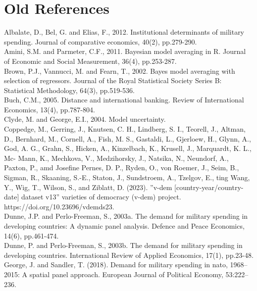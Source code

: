 \documentclass[12pt,a4paper]{article}
\begin{document}
\clearpage

\section{Old References}
Albalate, D., Bel, G. and Elias, F., 2012. Institutional determinants of military spending. Journal of comparative economics, 40(2), pp.279-290. \\

Amini, S.M. and Parmeter, C.F., 2011. Bayesian model averaging in R. Journal of Economic and Social Measurement, 36(4), pp.253-287. \\

Brown, P.J., Vannucci, M. and Fearn, T., 2002. Bayes model averaging with selection of regressors. Journal of the Royal Statistical Society Series B: Statistical Methodology, 64(3), pp.519-536.\\

Buch, C.M., 2005. Distance and international banking. Review of International Economics, 13(4), pp.787-804. \\

Clyde, M. and George, E.I., 2004. Model uncertainty.\\

Coppedge, M., Gerring, J., Knutsen, C. H., Lindberg, S. I., Teorell, J., Altman, D., Bernhard, M., Cornell, A., Fish, M. S., Gastaldi, L., Gjerloew, H., Glynn, A., God, A. G., Grahn, S., Hicken, A., Kinzelbach, K., Krusell, J., Marquardt, K. L., Mc- Mann, K., Mechkova, V., Medzihorsky, J., Natsika, N., Neundorf, A., Paxton, P., amd Josefine Pernes, D. P., Ryden, O., von Roemer, J., Seim, B., Sigman, R., Skaaning, S.-E., Staton, J., Sundstroem, A., Tzelgov, E., ting Wang, Y., Wig, T., Wilson, S., and Ziblatt, D. (2023). ”v-dem [country-year/country-date] dataset v13” varieties of democracy (v-dem) project. https://doi.org/10.23696/vdemds23. \\

Dunne, J.P. and Perlo-Freeman, S., 2003a. The demand for military spending in developing countries: A dynamic panel analysis. Defence and Peace Economics, 14(6), pp.461-474.\\

Dunne, P. and Perlo-Freeman, S., 2003b. The demand for military spending in developing countries. International Review of Applied Economics, 17(1), pp.23-48. \\

George, J. and Sandler, T. (2018). Demand for military spending in nato, 1968–2015: A spatial panel approach. European Journal of Political Economy, 53:222–236. \\
\end{document}

